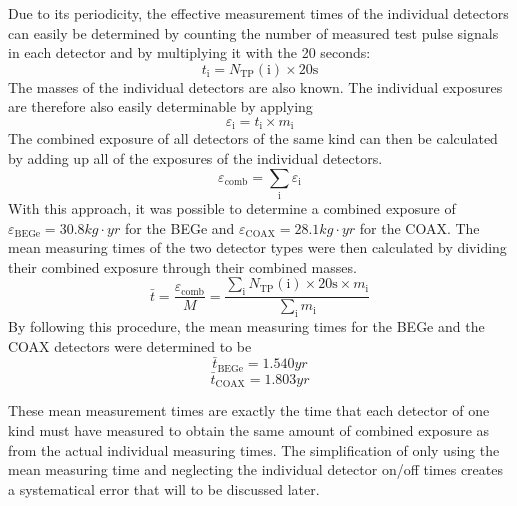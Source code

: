 \documentclass[encoding=utf8,british]{tumphthesis}
\begin{document}
Due to its periodicity, the effective measurement times of the individual detectors can easily be determined by counting the number of measured test pulse signals in each detector and by multiplying it with the 20 seconds:
\begin{equation}
    t_\mathrm{i} = N_{\mathrm{TP}}(\mathrm{i}) \times 20\mathrm{s}
\end{equation}
The masses of the individual detectors are also known.
The individual exposures are therefore also easily determinable by applying 
\begin{equation}
    \varepsilon_\mathrm{i} = t_\mathrm{i} \times m_\mathrm{i}
\end{equation}
The combined exposure of all detectors of the same kind can then be calculated by adding up all of the exposures of the individual detectors.  
\begin{equation}
    \varepsilon_{\mathrm{comb}} = \sum_\mathrm{i} \varepsilon_\mathrm{i}
\end{equation}
With this approach, it was possible to determine a combined exposure of $\varepsilon_{\mathrm{BEGe}} = 30.8 \unit{kg}\cdot \unit{yr}$ for the BEGe and $\varepsilon_{\mathrm{COAX}} = 28.1 \unit{kg}\cdot \unit{yr}  $ for the COAX.
The mean measuring times of the two detector types were then calculated by dividing their combined exposure through their combined masses. 
\begin{equation}
    \bar{t} = \frac{\varepsilon_{\mathrm{comb}}}{M} = \frac{\sum_\mathrm{i} N_{\mathrm{TP}}(\mathrm{i}) \times 20\mathrm{s} \times m_\mathrm{i}}{\sum_\mathrm{i} m_\mathrm{i}}
\end{equation}
By following this procedure, the mean measuring times for the BEGe and the COAX detectors were determined to be
\begin{equation*}
   \bar{t}_{\mathrm{BEGe}} = 1.540 \unit{yr}  
\end{equation*}
\begin{equation*}
    \bar{t}_{\mathrm{COAX}} = 1.803 \unit{yr} 
\end{equation*}

These mean measurement times are exactly the time that each detector of one kind must have measured to obtain the same amount of combined exposure as from the actual individual measuring times.
The simplification of only using the mean measuring time and neglecting the individual detector on/off times creates a systematical error that will to be discussed later.
\\
\end{document}
